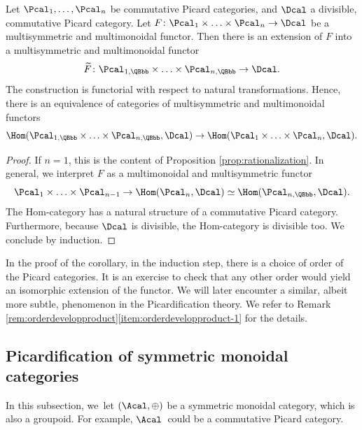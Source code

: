\begin{corollary}\label{cor:rationalization}
Let $\Pcal_{1},\ldots,\Pcal_{n}$ be commutative Picard categories, and $\Dcal$ a divisible, commutative Picard category. Let $F\colon \Pcal_{1}\times\ldots\times\Pcal_{n}\to\Dcal$ be a multisymmetric and multimonoidal functor. Then there is an extension of $F$ into a multisymmetric and multimonoidal functor
\begin{displaymath}
\widetilde{F}\colon \Pcal_{1,\QBbb}\times\ldots \times \Pcal_{n,\QBbb}\to \Dcal.
\end{displaymath}
The construction is functorial with respect to natural transformations. Hence, there is an equivalence of categories of multisymmetric and multimonoidal functors
\begin{displaymath}
\Hom(\Pcal_{1,\QBbb}\times\ldots\times\Pcal_{n,\QBbb},\Dcal)\to\Hom(\Pcal_{1}\times\ldots\times\Pcal_{n},\Dcal).
\end{displaymath}
\end{corollary}
\begin{proof}
If $n=1$, this is the content of Proposition \ref{prop:rationalization}. In general, we interpret $F$ as a multimonoidal and multisymmetric functor
\[
\Pcal_{1}\times\ldots\times\Pcal_{n-1}\to\Hom(\Pcal_{n},\Dcal)\simeq\Hom(\Pcal_{n,\QBbb},\Dcal).
\]
The Hom-category has a natural structure of a commutative Picard category. Furthermore, because $\Dcal$ is divisible, the Hom-category is divisible too. We conclude by induction.
\end{proof}
\begin{remark}\label{rmk:order-rationalization}
In the proof of the corollary, in the induction step, there is a choice of order of the Picard categories. It is an exercise to check that any other order would yield an isomorphic extension of the functor. We will later encounter a similar, albeit more subtle, phenomenon in the Picardification theory. We refer to Remark \ref{rem:orderdevelopproduct}\eqref{item:orderdevelopproduct-1} for the details.
\end{remark}

\subsection{Picardification of symmetric monoidal categories}\label{subsubsec:picardification}
In this subsection, we~let $(\Acal,\oplus)$ be a symmetric monoidal category, which is also a groupoid. For example, $\Acal$~could be a commutative Picard category.

